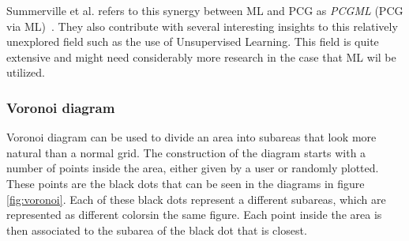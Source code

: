 Summerville et al. refers to this synergy between ML and PCG as \textit{PCGML} (PCG via ML)~\cite{lmao_ml}.
They also contribute with several interesting insights to this relatively unexplored field such as the use of Unsupervised Learning.
This field is quite extensive and might need considerably more research in the case that ML wil be utilized.

\subsubsection{Voronoi diagram}
Voronoi diagram can be used to divide an area into subareas that look more natural than a normal grid. 
The construction of the diagram starts with a number of points inside the area, either given by a user or randomly plotted. 
These points are the black dots that can be seen in the diagrams in figure \ref{fig:voronoi}.
Each of these black dots represent a different subareas, which are represented as different colorsin the same figure.
Each point inside the area is then associated to the subarea of the black dot that is closest.

